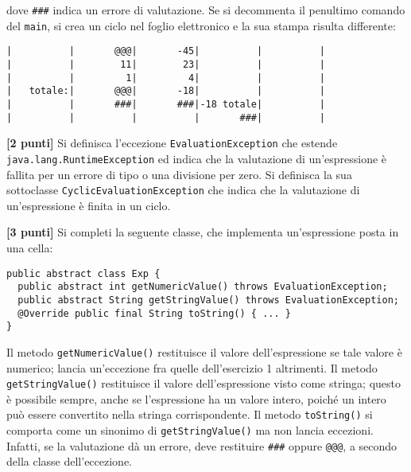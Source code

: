 \documentclass{article}[10pt]
\newcounter{esnu}
\newenvironment{esercizio}{\medskip \noindent {\bf Esercizio\addtocounter{esnu}{1} \arabic{esnu}}}{}
\begin{document}
\noindent
dove \texttt{\#\#\#} indica un errore di valutazione.
Se si decommenta il penultimo comando del \texttt{main}, si crea un ciclo nel foglio elettronico
e la sua stampa risulta differente:

{\scriptsize
\begin{verbatim}
|          |       @@@|       -45|          |          |
|          |        11|        23|          |          |
|          |         1|         4|          |          |
|   totale:|       @@@|       -18|          |          |
|          |       ###|       ###|-18 totale|          |
|          |          |          |       ###|          |
\end{verbatim}
}

\begin{esercizio}
\textbf{[2 punti]}
Si definisca l'eccezione \texttt{EvaluationException} che estende \texttt{java.lang.RuntimeException}
ed indica che la valutazione di un'espressione \`e fallita per un errore di tipo o una divisione per zero.
Si definisca la sua sottoclasse \texttt{CyclicEvaluationException} che indica che la valutazione di un'espressione
\`e finita in un ciclo.
\end{esercizio}

\begin{esercizio}
\textbf{[3 punti]}
Si completi la seguente classe, che implementa un'espressione posta in una cella:

{\small
\begin{verbatim}
public abstract class Exp {
  public abstract int getNumericValue() throws EvaluationException;
  public abstract String getStringValue() throws EvaluationException;
  @Override public final String toString() { ... }
}
\end{verbatim}
}

\noindent
Il metodo \texttt{getNumericValue()} restituisce il valore dell'espressione se tale valore 
\`e numerico; lancia un'eccezione fra quelle dell'esercizio 1 altrimenti. Il metodo
\texttt{getStringValue()} restituisce il valore dell'espressione visto come stringa; questo \`e
possibile sempre, anche se l'espressione ha un valore intero, poich\'e un intero pu\`o essere convertito
nella stringa corrispondente. Il metodo \texttt{toString()} si comporta come un sinonimo di
\texttt{getStringValue()} ma non lancia eccezioni. Infatti, se la valutazione d\`a un errore, deve restituire
\texttt{\#\#\#} oppure \texttt{@@@}, a secondo della classe dell'eccezione.
\end{esercizio}
\end{document}
